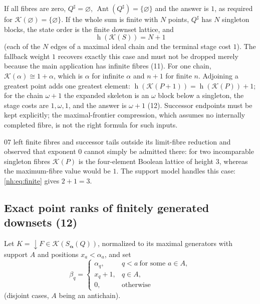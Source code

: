 \documentclass[11pt,a4paper]{article}
\theoremstyle{definition}
\theoremstyle{remark}
\newcommand{\K}{\mathcal K}
\newcommand{\hgt}{\operatorname{h}}
\newcommand{\Ant}{\operatorname{Ant}}
\begin{document}
If all fibres are zero, $Q^\sharp=\varnothing$, $\Ant(Q^\sharp)=\{\varnothing\}$
and the answer is $1$, as required for $\K(\varnothing)=\{\varnothing\}$. If the
whole sum is finite with $N$ points, $Q^\sharp$ has $N$ singleton blocks, the
state order is the finite downset lattice, and
\begin{equation}\label{nh:eq:finite}
 \hgt(\K(S))=N+1
\end{equation}
(each of the $N$ edges of a maximal ideal chain and the terminal stage cost
$1$). The fallback weight $1$ recovers exactly this case and must not be
dropped merely because the main application has infinite fibres (11). For one
chain, $\K(\alpha)\cong1+\alpha$, which is $\alpha$ for infinite $\alpha$ and
$n+1$ for finite $n$. Adjoining a greatest point adds one greatest element:
$\hgt(\K(P+1))=\hgt(\K(P))+1$; for the chain $\omega+1$ the expanded skeleton is
an $\omega$ block below a singleton, the stage costs are $1,\omega,1$, and the
answer is $\omega+1$ (12). Successor endpoints must be kept explicitly; the
maximal-frontier compression, which assumes no internally completed fibre, is
not the right formula for such inputs.

07 left finite fibres and successor tails outside its limit-fibre reduction and
observed that exponent $0$ cannot simply be admitted there: for two
incomparable singleton fibres $\K(P)$ is the four-element Boolean lattice of
height $3$, whereas the maximum-fibre value would be $1$. The support model
handles this case: \eqref{nh:eq:finite} gives $2+1=3$.

\subsection{Exact point ranks of finitely generated downsets (12)}

Let $K={\downarrow}F\in\K(S_{\boldsymbol\alpha}(Q))$, normalized to its maximal
generators with support $A$ and positions $x_a<\alpha_a$, and set
\begin{equation}\label{nh:eq:localfibers}
 \beta_q=\begin{cases}
 \alpha_q,&q<a\ \text{for some }a\in A,\\
 x_q+1,&q\in A,\\
 0,&\text{otherwise}
 \end{cases}
\end{equation}
(disjoint cases, $A$ being an antichain).
\end{document}
